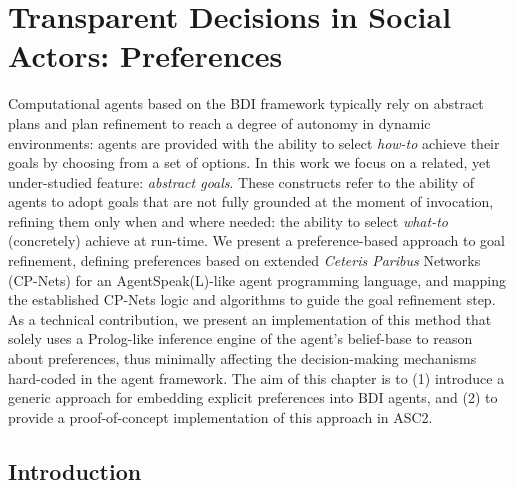 \chapter{Transparent Decisions in Social Actors: Preferences}
\label{ch:preferences}
Computational agents based on the BDI framework typically rely on abstract plans and plan refinement to reach a degree of autonomy in dynamic environments: agents are provided with the 
ability to select \textit{how-to} achieve their goals by choosing from a set of options. In this work we focus on a related, yet under-studied feature: \textit{abstract goals}. These constructs refer to the ability of agents to adopt goals that are not fully grounded at the moment of invocation, refining them only when and where needed: the ability to select \textit{what-to} (concretely) achieve at run-time. We present a preference-based approach to goal refinement,  defining preferences based on extended \textit{Ceteris Paribus} Networks (CP-Nets) for an AgentSpeak(L)-like agent programming language, and mapping the established CP-Nets logic and algorithms to guide the goal refinement step. As a technical contribution, we present an implementation of this method that solely uses a Prolog-like inference engine of the agent's belief-base to reason about preferences, thus minimally affecting the decision-making mechanisms hard-coded in the agent framework. The aim of this chapter is to (1) introduce a generic approach for embedding explicit preferences into BDI agents, and (2) to provide a proof-of-concept implementation of this approach in ASC2. 


\section{Introduction}


